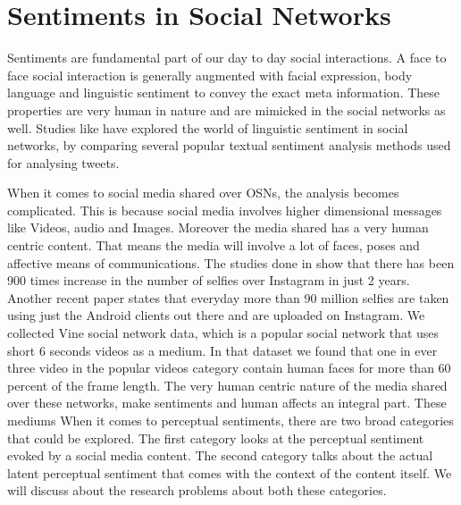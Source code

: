 \section{Sentiments in Social Networks}
Sentiments are fundamental part of our day to day social interactions. A face to face social interaction is generally augmented with facial expression, body language and linguistic sentiment to convey the exact meta information. These properties are very human in nature and are mimicked in the social networks as well. Studies like \cite{Joo2014b} have explored the world of linguistic sentiment in social networks, by comparing several popular textual sentiment analysis methods used for analysing tweets. 
\par
When it comes to social media shared over OSNs, the analysis becomes complicated. This is because social media involves higher dimensional messages like Videos, audio and Images. 
Moreover the media shared has a very human centric content. That means the media will involve a lot of faces, poses and affective means of communications. The studies done in \cite{Souza2015} show that there has been 900 times increase in the number of selfies over Instagram in just 2 years. Another recent paper \cite{goodSelfie} states that everyday more than 90 million selfies are taken using just the Android clients out there and are uploaded on Instagram. We collected Vine social network data, which is a popular social network that uses short 6 seconds videos as a medium. In that dataset we found that  one in ever three video in the popular videos category contain human faces for more than 60 percent of the frame length. 
The very human centric nature of the media shared over these networks, make sentiments and human affects an integral part. These mediums 
When it comes to perceptual sentiments, there are two broad categories that could be explored. The first category looks at the perceptual sentiment evoked by a social media content. The second category talks about the actual latent perceptual sentiment that comes with the context of the content itself. We will discuss about the research problems about both these categories.

